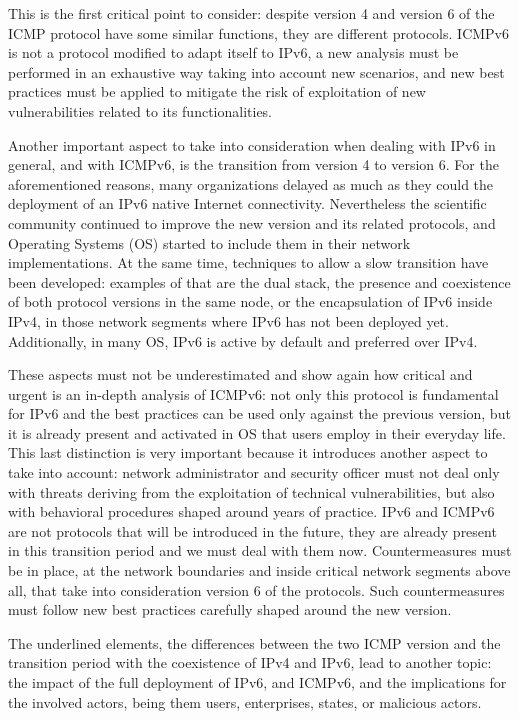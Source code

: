 \documentclass[12pt]{article}
\begin{document}
This is the first critical point to consider: despite version 4 and version 6 of the ICMP protocol have some similar functions, they are different protocols. ICMPv6 is not a protocol modified to adapt itself to IPv6, a new analysis must be performed in an exhaustive way taking into account new scenarios, and new best practices must be applied to mitigate the risk of exploitation of new vulnerabilities related to its functionalities.

Another important aspect to take into consideration when dealing with IPv6 in general, and with ICMPv6, is the transition from version 4 to version 6. For the aforementioned reasons, many organizations delayed as much as they could the deployment of an IPv6 native Internet connectivity. Nevertheless the scientific community continued to improve the new version and its related protocols, and Operating Systems (OS) started to include them in their network implementations. At the same time, techniques to allow a slow transition have been developed: examples of that are the dual stack, the presence and coexistence of both protocol versions in the same node, or the encapsulation of IPv6 inside IPv4, in those network segments where IPv6 has not been deployed yet. Additionally, in many OS, IPv6 is active by default and preferred over IPv4.

These aspects must not be underestimated and show again how critical and urgent is an in-depth analysis of ICMPv6: not only this protocol is fundamental for IPv6 and the best practices can be used only against the previous version, but it is already present and activated in OS that users employ in their everyday life. This last distinction is very important because it introduces another aspect to take into account: network administrator and security officer must not deal only with threats deriving from the exploitation of technical vulnerabilities, but also with behavioral procedures shaped around years of practice. IPv6 and ICMPv6 are not protocols that will be introduced in the future, they are already present in this transition period and we must deal with them now. Countermeasures must be in place, at the network boundaries and inside critical network segments above all, that take into consideration version 6 of the protocols. Such countermeasures must follow new best practices carefully shaped around the new version.

The underlined elements, the differences between the two ICMP version and the transition period with the coexistence of IPv4 and IPv6, lead to another topic: the impact of the full deployment of IPv6, and ICMPv6, and the implications for the involved actors, being them users, enterprises, states, or malicious actors.
\end{document}
